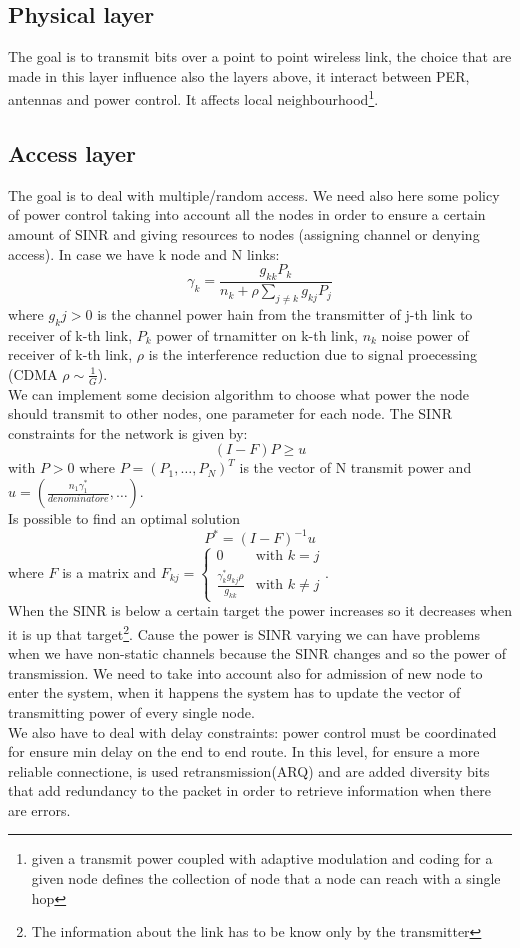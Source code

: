 \subsection{Physical layer}
The goal is to transmit bits over a point to point wireless link, the choice that are made in this layer influence also the layers above, it interact between PER, antennas and power control. It affects local neighbourhood\footnote{given a transmit power coupled with adaptive modulation and coding for a given node defines the collection of node that a node can reach with a single hop}.

\subsection{Access layer}
The goal is to deal with multiple/random access. We need also here some policy of  power control taking into account all the nodes in order to ensure a certain amount of SINR and giving resources to nodes (assigning channel or denying access). In case we have k node and N links:
	$$\gamma_k=\frac{g_{kk}P_k}{n_k+\rho\sum_{j\ne k}g_{kj}P_j}$$
where $ g_kj>0 $ is the channel power hain from the transmitter of j-th link to receiver of k-th link, $ P_k $ power of trnamitter on k-th link, $ n_k $ noise power of receiver of k-th link, $ \rho $ is the interference reduction due to signal proecessing (CDMA $ \rho\sim\frac{1}{G} $).\\
We can implement some decision algorithm to choose what power the node should transmit to other nodes, one parameter for each node. The SINR constraints for the network is given by: 
	$$ (I-F)P\ge u $$
with $ P>0 $ where $ P=(P_1,\dots,P_N)^T $ is the vector of N transmit power and $ u=(\frac{n_1\gamma_1^*}{denominatore},\dots) $.\\
Is possible to find an optimal solution
$$P^*=(I-F)^{-1}u$$
where $ F $ is a matrix and $ F_{kj}=\begin{cases}0& \text{with } k=j\\ \frac{\gamma_k^*g_{kj}\rho}{g_{kk}} &\text{with } k\ne j\end{cases} $.\\
When the SINR is below a certain target the power increases so it decreases when it is up that target\footnote{The information about the link has to be know only by the transmitter}. Cause the power is SINR varying we can have problems when we have non-static channels because the SINR changes and so the power of transmission. We need to take into account also for admission of new node to enter the system, when it happens the system has to update the vector of transmitting power of every single node.\\
We also have to deal with delay constraints: power control must be coordinated for ensure min delay on the end to end route. In this level, for ensure a more reliable connectione, is used retransmission(ARQ) and are added diversity bits that add redundancy to the packet in order to retrieve information when there are errors.

